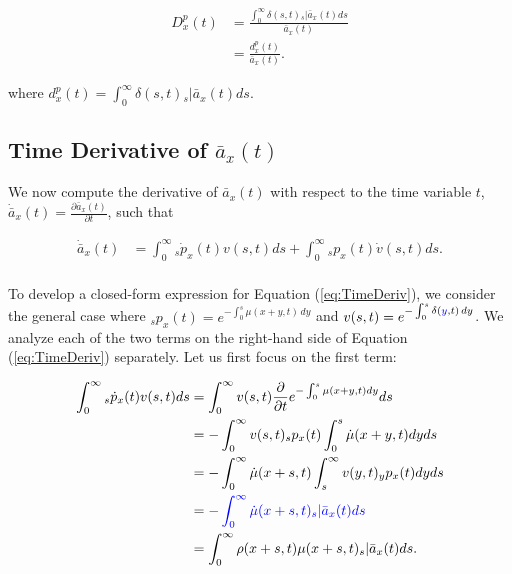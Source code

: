 \documentclass[12pt]{article}
\newcommand{\revision}[1]{\textcolor{blue}{#1}}
\begin{document}
\begin{equation}\label{eq:DurationP2}
\begin{split}
{D}^{p}_{x}(t) &= \frac{\int_0^\infty \delta(s,t) {}_s|\bar{a}_x(t)ds} {\bar{a}_x(t)} \\
                 &= \frac{{d}^{p}_{x}(t)}{\bar{a}_x(t)}.
\end{split}
\end{equation}


where ${d}^{p}_{x}(t)=\int_0^\infty \delta(s,t) {}_s|\bar{a}_x(t) ds$. 

\subsection{Time Derivative of $\bar{a}_x(t)$} \label{sec:timderiv}

We now compute the derivative of $\bar{a}_x(t)$ with respect to the time variable $t$, $\dot{\bar{a}} _x(t)=\frac{\partial \bar{a}_x(t)}{\partial t}$, such that

\begin{equation}\label{eq:TimeDeriv}
\begin{split}
\dot{\bar{a}} _x(t) &= \int_0^\infty {}_s\dot{p}_x(t) v(s,t)ds +\int_0^\infty {}_sp_x(t) \dot{v}(s,t)ds.\\
\end{split}
\end{equation}


To develop a closed-form expression for Equation (\ref{eq:TimeDeriv}), we consider the general case where $_s p_x(t) = e^{-\int_{0}^{s} \mu(x+y,t) \, dy}$ and ${v}(s,t) = e^{-\int_{0}^{s} \delta(\revision{y},t) \, dy}$. We analyze each of the two terms on the right-hand side of Equation (\ref{eq:TimeDeriv}) separately. Let us first focus on the first term:


\begin{equation}\label{eq:TimeDerivP1}
\begin{split}
\int_0^\infty {}_s\dot{p}_x(t) v(s,t)ds &= \int_0^\infty   v(s,t) \frac{\partial  }{\partial t}e^{-\int_0^{s}{\mu}(x+y,t)dy}ds\\
&= -\int_0^\infty   v(s,t) {}_sp_x(t)\int_0^{s}\dot{\mu}(x+y,t)dyds\\
&= -\int_0^\infty  \dot{\mu}(x+s,t) \int_s^{\infty} v(y,t) {}_yp_x(t) dyds\\
&= \revision{-\int_0^\infty  \dot{\mu}(x+s,t) {}_s|\bar{a}_x(t)ds}\\
&= \int_0^\infty \rho(x+s,t) \mu(x+s,t)   {}_s|\bar{a}_x(t) ds.\\
\end{split}
\end{equation}
\end{document}
